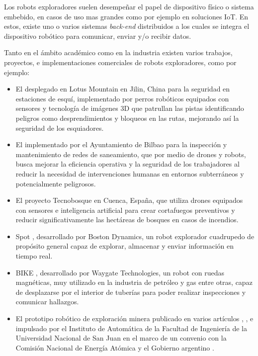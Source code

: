 Los robots exploradores suelen desempeñar el papel de dispositivo físico o sistema embebido, en casos de uso mas grandes como por ejemplo en soluciones IoT. En estos, existe uno o varios sistemas \textit{back-end} distribuidos a los cuales se integra el dispositivo robótico para comunicar, enviar y/o recibir datos.

Tanto en el ámbito académico como en la industria existen varios trabajos, proyectos, e implementaciones comerciales de robots exploradores, como por ejemplo: 

\begin{itemize}
	\item El desplegado en Lotus Mountain \cite{iot_usecase_seg_china} en Jilin, China para la seguridad en estaciones de esquí, implementado por perros robóticos equipados con sensores y tecnología de imágenes 3D que patrullan las pistas identificando peligros como desprendimientos y bloqueos en las rutas, mejorando así la seguridad de los esquiadores.

	\item El implementado por el Ayuntamiento de Bilbao \cite{iot_usecase_bilbao} para la inspección y mantenimiento de redes de saneamiento, que por medio de drones y robots, busca mejorar la eficiencia operativa y la seguridad de los trabajadores al reducir la necesidad de intervenciones humanas en entornos subterráneos y potencialmente peligrosos.

	\item El proyecto Tecnobosque \cite{iot_usecase_cuenca} en Cuenca, España, que utiliza drones equipados con sensores e inteligencia artificial para crear cortafuegos preventivos y reducir significativamente las hectáreas de bosques en casos de incendios. 


	\item Spot \cite{spot}, desarrollado por Boston Dynamics, un robot explorador cuadrupedo de propósito general capaz de explorar, almacenar y enviar información en tiempo real.
	  
	\item BIKE \cite{bike_inspection}, desarrollado por Waygate Technologies, un robot con ruedas magnéticas, muy utilizado en la industria de petróleo y gas entre otras, capaz de desplazarse por el interior de tuberías para poder realizar inspecciones y comunicar hallazgos.

	\item El prototipo robótico de exploración minera publicado en varios artículos \cite{latam-mining-robot-minero-unsj}, \cite{diario-de-cuyo-prototipo-robotico}, e impulsado por el Instituto de Automática de la Facultad de Ingeniería de la Universidad Nacional de San Juan en el marco de un convenio con la Comisión Nacional de Energía Atómica y el Gobierno argentino \cite{comunicacion-unsj-prototipo-convenio}.


\end{itemize}
